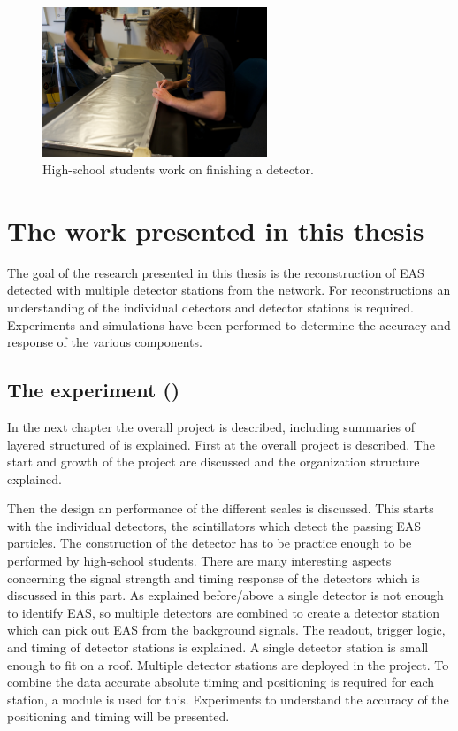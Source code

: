 \begin{figure}
    \centering
    \includegraphics[width=0.6\textwidth]
                    {plots/cosmic-rays/ADL_100352}
    \caption{High-school students work on finishing a detector.}
    \label{fig:detector-bouw}
\end{figure}


\section{The work presented in this thesis}

The goal of the research presented in this thesis is the reconstruction of EAS detected with multiple detector stations from the \hisparc network. For reconstructions an understanding of the individual detectors and detector stations is required. Experiments and simulations have been performed to determine the accuracy and response of the various components.


\subsection{The \hisparc experiment
            ()}

In the next chapter the overall project is described, including summaries of layered structured of \hisparc is explained. First at the overall project is described. The start and growth of the project are discussed and the organization structure explained.

Then the design an performance of the different scales is discussed. This starts with the individual detectors, the scintillators which detect the passing EAS particles. The construction of the detector has to be practice enough to be performed by high-school students. There are many interesting aspects concerning the signal strength and timing response of the detectors which is discussed in this part. As explained before/above a single detector is not enough to identify EAS, so multiple detectors are combined to create a detector station which can pick out EAS from the background signals. The readout, trigger logic, and timing of detector stations is explained. A single detector station is small enough to fit on a roof. Multiple detector stations are deployed in the \hisparc project. To combine the data accurate absolute timing and positioning is required for each station, a \gps module is used for this. Experiments to understand the accuracy of the \gps positioning and timing will be presented.


